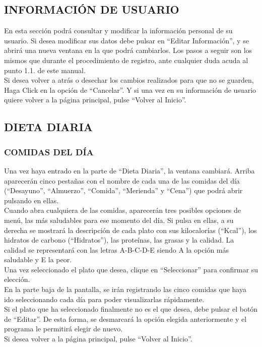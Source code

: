 \subsection{INFORMACIÓN DE USUARIO}

En esta sección podrá consultar y modificar la información personal de su usuario. Si desea modificar sus datos debe pulsar en “Editar Información”, y se abrirá una nueva ventana en la que podrá cambiarlos. Los pasos a seguir son los mismos que durante el procedimiento de registro, ante cualquier duda acuda al punto 1.1. de este manual.\\
Si desea volver a atrás o desechar los cambios realizados para que no se guarden, Haga Click en la opción de “Cancelar”. Y si una vez en su información de usuario quiere volver a la página principal, pulse “Volver al Inicio”.
\subsection{DIETA DIARIA}
\subsubsection{COMIDAS DEL DÍA}
Una vez haya entrado en la parte de “Dieta Diaria”, la ventana cambiará. Arriba aparecerán cinco pestañas con el nombre de cada una de las comidas del día (“Desayuno”, “Almuerzo”, “Comida”, “Merienda” y “Cena”) que podrá abrir pulsando en ellas.\\

Cuando abra cualquiera de las comidas, aparecerán tres posibles opciones de menú, las más saludables para ese momento del día. Si pulsa en ellas, a su derecha se mostrará la descripción de cada plato con sus kilocalorías (“Kcal”), los hidratos de carbono (“Hidratos”), las proteínas, las grasas y la calidad. La calidad se representará con las letras A-B-C-D-E siendo A la opción más saludable y E la peor.
\\
Una vez seleccionado el plato que desea, clique en “Seleccionar” para confirmar su elección.\\
En la parte baja de la pantalla, se irán registrando las cinco comidas que haya ido seleccionando cada día para poder visualizarlas rápidamente.\\
Si el plato que ha seleccionado finalmente no es el que desea, debe pulsar el botón de “Editar”. De esta forma, se desmarcará la opción elegida anteriormente y el programa le permitirá elegir de nuevo.\\
Si desea volver a la página principal, pulse “Volver al Inicio”.
